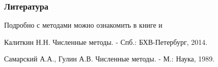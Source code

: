 \documentclass[10pt]{beamer}
\begin{document}
\begin{frame}[fragile]
\frametitle{Литература}
Подробно с методами можно ознакомить в книге \cite[стр. 138]{Kalitkin} и \cite[стр. 130]{Samarsky}


\begin{thebibliography}{99}

Калиткин Н.Н. Численные методы. - Спб.: БХВ-Петербург, 2014.

Самарский А.А., Гулин А.В. Численные методы. - М.: Наука, 1989.

\end{thebibliography}
\end{frame}
\end{document}
